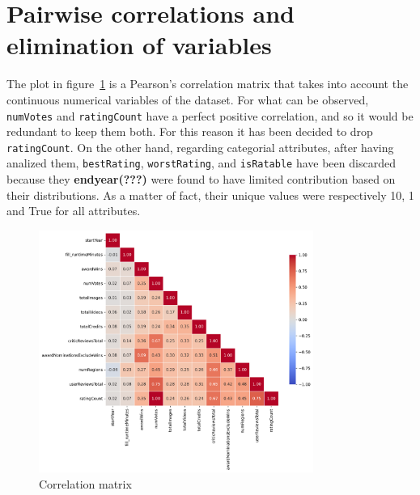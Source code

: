 \section{Pairwise correlations and elimination of variables}\label{sec:correlation}
The plot in figure~\ref{fig:correlation_matrix} is a Pearson's correlation matrix that takes into account the continuous numerical variables of the dataset.
For what can be observed, \texttt{numVotes} and \texttt{ratingCount} have a perfect positive correlation, and so it would be redundant to keep them both.
For this reason it has been decided to drop \texttt{ratingCount}. 
On the other hand, regarding categorial attributes, after having analized them, \texttt{bestRating}, \texttt{worstRating}, and \texttt{isRatable} have been discarded because they \textbf{endyear(???)} were found to have limited contribution based on their distributions.
As a matter of fact, their unique values were respectively 10, 1 and True for all attributes.
\begin{figure}[h!] %
    \centering %
    \includegraphics[width=0.8\textwidth]{plots/correlation_matrix.png} %
    \caption{Correlation matrix} %
    \label{fig:correlation_matrix} %
\end{figure}
